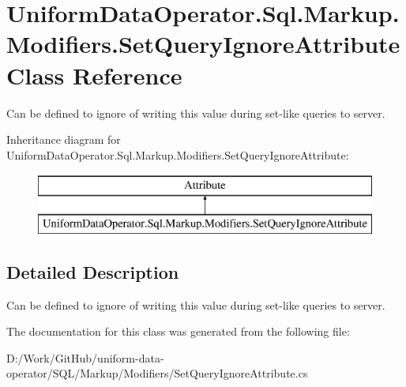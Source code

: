 \hypertarget{class_uniform_data_operator_1_1_sql_1_1_markup_1_1_modifiers_1_1_set_query_ignore_attribute}{}\section{Uniform\+Data\+Operator.\+Sql.\+Markup.\+Modifiers.\+Set\+Query\+Ignore\+Attribute Class Reference}
\label{class_uniform_data_operator_1_1_sql_1_1_markup_1_1_modifiers_1_1_set_query_ignore_attribute}


Can be defined to ignore of writing this value during set-\/like queries to server.  


Inheritance diagram for Uniform\+Data\+Operator.\+Sql.\+Markup.\+Modifiers.\+Set\+Query\+Ignore\+Attribute\+:\begin{figure}[H]
\begin{center}
\leavevmode
\includegraphics[height=2.000000cm]{db/d05/class_uniform_data_operator_1_1_sql_1_1_markup_1_1_modifiers_1_1_set_query_ignore_attribute}
\end{center}
\end{figure}


\subsection{Detailed Description}
Can be defined to ignore of writing this value during set-\/like queries to server. 



The documentation for this class was generated from the following file\+:\begin{DoxyCompactItemize}
\item 
D\+:/\+Work/\+Git\+Hub/uniform-\/data-\/operator/\+S\+Q\+L/\+Markup/\+Modifiers/Set\+Query\+Ignore\+Attribute.\+cs\end{DoxyCompactItemize}
